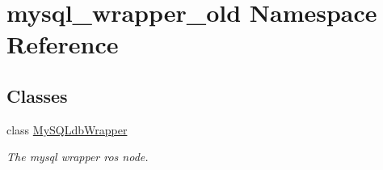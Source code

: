 \hypertarget{namespacemysql__wrapper__old}{\section{mysql\-\_\-wrapper\-\_\-old Namespace Reference}
\label{namespacemysql__wrapper__old}
}
\subsection*{Classes}
\begin{DoxyCompactItemize}
\item 
class \hyperlink{classmysql__wrapper__old_1_1MySQLdbWrapper}{My\-S\-Q\-Ldb\-Wrapper}
\begin{DoxyCompactList}\small\item\em The mysql wrapper ros node. \end{DoxyCompactList}\end{DoxyCompactItemize}
